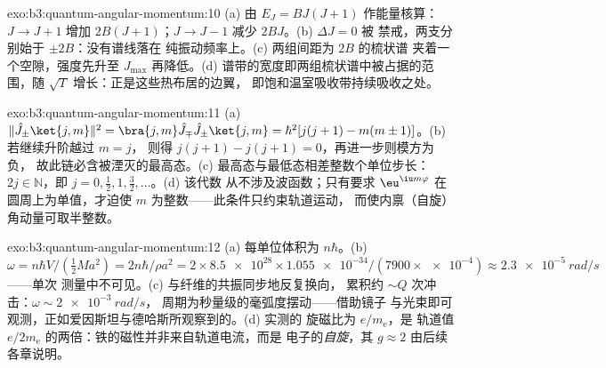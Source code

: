 \begin{solution}{exo:b3:quantum-angular-momentum:10}
(a) 由 $E_J = BJ(J+1)$ 作能量核算：$J \to J + 1$ 增加
$2B(J+1)$；$J \to J - 1$ 减少 $2BJ$。(b) $\Delta J = 0$ 被
禁戒，两支分别始于 $\pm 2B$：没有谱线落在
纯振动频率上。(c) 两组间距为 $2B$ 的梳状谱
夹着一个空隙，强度先升至 $J_{\max}$ 再降低。(d)
谱带的宽度即两组梳状谱中被占据的范围，随
$\sqrt{T}$ 增长：正是这些热布居的边翼，
即饱和温室吸收带持续吸收之处。
\end{solution}

\begin{solution}{exo:b3:quantum-angular-momentum:11}
(a) $\|\hat J_\pm\ket{j,m}\|^2 = \bra{j,m}\hat J_\mp\hat J_\pm
\ket{j,m} = \hbar^2[j(j+1) - m(m\pm1)]$。(b) 若继续升阶越过 $m = j$，
则得 $j(j+1) - j(j+1) = 0$，再进一步则模方为负，
故此链必含被湮灭的最高态。(c)
最高态与最低态相差整数个单位步长：$2j \in
\mathbb N$，即 $j = 0, \tfrac12, 1, \tfrac32, \dots$。(d) 该代数
从不涉及波函数；只有要求
$\eu^{\iu m\varphi}$ 在圆周上为单值，才迫使
$m$ 为整数——此条件只约束轨道运动，
而使内禀（自旋）角动量可取半整数。
\end{solution}

\begin{solution}{exo:b3:quantum-angular-momentum:12}
(a) 每单位体积为 $n\hbar$。(b) $\omega = n\hbar V/(\tfrac12 Ma^2)
= 2n\hbar/\rho a^2 = 2 \times \num{8.5e28} \times \num{1.055e-34}/
(7900 \times \num{e-4}) \approx \qty{2.3e-5}{rad/s}$——单次
测量中不可见。(c) 与纤维的共振同步地反复换向，
累积约 $\sim Q$ 次冲击：$\omega \sim \qty{2e-3}{rad/s}$，
周期为秒量级的毫弧度摆动——借助镜子
与光束即可观测，正如爱因斯坦与德哈斯所观察到的。(d) 实测的
旋磁比为 $e/m_{\text{e}}$，是
轨道值 $e/2m_{\text{e}}$ 的两倍：铁的磁性并非来自轨道电流，而是
电子的\emph{自旋}，其 $g \approx 2$ 由后续各章说明。
\end{solution}

